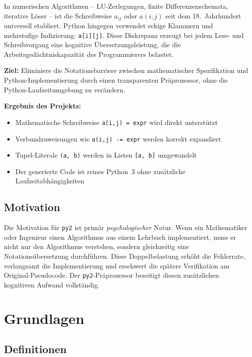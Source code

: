 \documentclass[a4paper,12pt]{article}
\theoremstyle{definition}
\begin{document}
In numerischen Algorithmen -- LU-Zerlegungen, finite Differenzenschemata, iterative
L\"oser -- ist die Schreibweise $a_{ij}$ oder $a(i,j)$ seit dem 18.\ Jahrhundert
universell etabliert. Python hingegen verwendet eckige Klammern und mehrstufige
Indizierung: \texttt{a[i][j]}. Diese Diskrepanz erzeugt bei jedem Lese- und
Schreibvorgang eine kognitive \"Ubersetzungsleistung, die die Arbeitsged\"achtniskapazit\"at
des Programmierers belastet.

\textbf{Ziel:} Eliminiere die Notationsbarriere zwischen mathematischer Spezifikation
und Python-Implementierung durch einen transparenten Pr\"aprozessor, ohne die
Python-Laufzeitumgebung zu ver\"andern.

\textbf{Ergebnis des Projekts:}
\begin{itemize}
	\item Mathematische Schreibweise \texttt{a(i,j) = expr} wird direkt unterst\"utzt
	\item Verbundzuweisungen wie \texttt{a(i,j) -= expr} werden korrekt expandiert
	\item Tupel-Literale \texttt{(a, b)} werden in Listen \texttt{[a, b]} umgewandelt
	\item Der generierte Code ist reines Python~3 ohne zus\"atzliche Laufzeitabh\"angigkeiten
\end{itemize}

\subsection{Motivation}

Die Motivation f\"ur \texttt{py2} ist prim\"ar \emph{psychologischer} Natur. Wenn ein
Mathematiker oder Ingenieur einen Algorithmus aus einem Lehrbuch implementiert, muss
er nicht nur den Algorithmus verstehen, sondern gleichzeitig eine Notations\"ubersetzung
durchf\"uhren. Diese Doppelbelastung erh\"oht die Fehlerrate, verlangsamt die Implementierung
und erschwert die spätere Verifikation am Original-Pseudocode. Der \texttt{py2}-Pr\"aprozessor
beseitigt diesen zus\"atzlichen kognitiven Aufwand vollst\"andig.

\section{Grundlagen}

\subsection{Definitionen}
\end{document}
